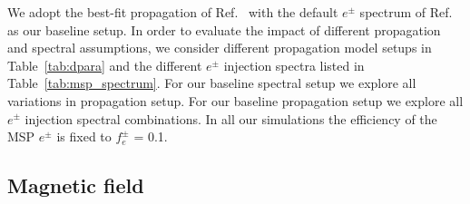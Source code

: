 \documentclass[doublespace,nopageskip]{VTthesis} %
\begin{document}
We adopt the best-fit propagation of Ref.~\cite{2016ApJ...824...16J} with the default $e^\pm$ spectrum of Ref.~\cite{2015ApJ...802..124Y} as our baseline setup. In order to evaluate the impact of different propagation and spectral assumptions, we consider different propagation model setups in Table~\ref{tab:dpara} and the different $e^{\pm}$ injection spectra listed in Table~\ref{tab:msp_spectrum}. For our baseline spectral setup we explore all variations in propagation setup. For our baseline propagation setup we explore all $e^{\pm}$ injection spectral combinations. In all our simulations the efficiency of the MSP $e^\pm$ is fixed to $f_e^\pm$ = 0.1.

\subsection{Magnetic field}\label{sec:bfield}
\end{document}
